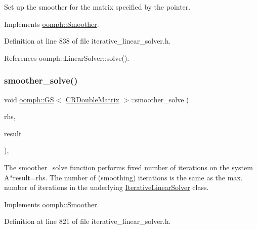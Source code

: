 Set up the smoother for the matrix specified by the pointer. 



Implements \hyperlink{classoomph_1_1Smoother_a6eb7009ab3bebcccc83062cbe980bf91}{oomph\+::\+Smoother}.



Definition at line 838 of file iterative\+\_\+linear\+\_\+solver.\+h.



References oomph\+::\+Linear\+Solver\+::solve().

\mbox{\label{classoomph_1_1GS_3_01CRDoubleMatrix_01_4_a0917e59d120fe7c49ecef62806392f6a}} 
\subsubsection{\texorpdfstring{smoother\+\_\+solve()}{smoother\_solve()}}
{\footnotesize\ttfamily void \hyperlink{classoomph_1_1GS}{oomph\+::\+GS}$<$ \hyperlink{classoomph_1_1CRDoubleMatrix}{C\+R\+Double\+Matrix} $>$\+::smoother\+\_\+solve (\begin{DoxyParamCaption}\item[{const \hyperlink{classoomph_1_1DoubleVector}{Double\+Vector} \&}]{rhs,  }\item[{\hyperlink{classoomph_1_1DoubleVector}{Double\+Vector} \&}]{result }\end{DoxyParamCaption})\hspace{0.3cm}{\ttfamily [inline]}, {\ttfamily [virtual]}}



The smoother\+\_\+solve function performs fixed number of iterations on the system A$\ast$result=rhs. The number of (smoothing) iterations is the same as the max. number of iterations in the underlying \hyperlink{classoomph_1_1IterativeLinearSolver}{Iterative\+Linear\+Solver} class. 



Implements \hyperlink{classoomph_1_1Smoother_a94899c8d7bf84c068cda8d312d195bfe}{oomph\+::\+Smoother}.



Definition at line 821 of file iterative\+\_\+linear\+\_\+solver.\+h.

